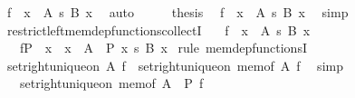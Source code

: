 \begin{isabellebody}
\ {\isacartoucheopen}f\ {\isasymin}\ {\isacharparenleft}{\kern0pt}x\ {\isasymin}\ A{\isacharparenright}{\kern0pt}\ {\isasymrightarrow}s\ {\isacharparenleft}{\kern0pt}B\ x{\isacharparenright}{\kern0pt}{\isacartoucheclose}\ \isamarkupfalse%
\ auto\isanewline
\ \ \isamarkupfalse%
\ \isamarkupfalse%
\ {\isacharquery}{\kern0pt}thesis\ \isamarkupfalse%
\ {\isacartoucheopen}f\ {\isasymin}\ {\isacharparenleft}{\kern0pt}x\ {\isasymin}\ A{\isacharparenright}{\kern0pt}\ {\isasymrightarrow}s\ {\isacharparenleft}{\kern0pt}B\ x{\isacharparenright}{\kern0pt}{\isacartoucheclose}\ \isamarkupfalse%
\ simp\isanewline
{}\isamarkupfalse%
%
\endisatagproof
{\isafoldproof}%
%
\isadelimproof
\isanewline
%
\endisadelimproof
\isanewline
{}\isamarkupfalse%
\ restrict{\isacharunderscore}{\kern0pt}left{\isacharunderscore}{\kern0pt}mem{\isacharunderscore}{\kern0pt}dep{\isacharunderscore}{\kern0pt}functions{\isacharunderscore}{\kern0pt}collectI{\isacharcolon}{\kern0pt}\isanewline
\ \ \ {\isachardoublequoteopen}f\ {\isasymin}\ {\isacharparenleft}{\kern0pt}x\ {\isasymin}\ A{\isacharparenright}{\kern0pt}\ {\isasymrightarrow}s\ {\isacharparenleft}{\kern0pt}B\ x{\isacharparenright}{\kern0pt}{\isachardoublequoteclose}\isanewline
\ \ \ {\isachardoublequoteopen}f{\isasymrestriction}\isactrlbsub P\isactrlesub \ {\isasymin}\ {\isacharparenleft}{\kern0pt}x\ {\isasymin}\ {\isacharbraceleft}{\kern0pt}x\ {\isasymin}\ A\ {\isacharbar}{\kern0pt}\ P\ x{\isacharbraceright}{\kern0pt}{\isacharparenright}{\kern0pt}\ {\isasymrightarrow}s\ {\isacharparenleft}{\kern0pt}B\ x{\isacharparenright}{\kern0pt}{\isachardoublequoteclose}\isanewline
%
\isadelimproof
%
\endisadelimproof
%
\isatagproof
{}\isamarkupfalse%
\ {\isacharparenleft}{\kern0pt}rule\ mem{\isacharunderscore}{\kern0pt}dep{\isacharunderscore}{\kern0pt}functionsI{\isacharparenright}{\kern0pt}\isanewline
\ \ \isamarkupfalse%
\ {\isachardoublequoteopen}set{\isacharunderscore}{\kern0pt}right{\isacharunderscore}{\kern0pt}unique{\isacharunderscore}{\kern0pt}on\ A\ f\ {\isacharequal}{\kern0pt}\ set{\isacharunderscore}{\kern0pt}right{\isacharunderscore}{\kern0pt}unique{\isacharunderscore}{\kern0pt}on\ {\isacharparenleft}{\kern0pt}mem{\isacharunderscore}{\kern0pt}of\ A{\isacharparenright}{\kern0pt}\ f{\isachardoublequoteclose}\ \isamarkupfalse%
\ simp\isanewline
\ \ \isamarkupfalse%
\ \isamarkupfalse%
\ {\isachardoublequoteopen}{\isachardot}{\kern0pt}{\isachardot}{\kern0pt}{\isachardot}{\kern0pt}\ {\isasymle}\ set{\isacharunderscore}{\kern0pt}right{\isacharunderscore}{\kern0pt}unique{\isacharunderscore}{\kern0pt}on\ {\isacharparenleft}{\kern0pt}mem{\isacharunderscore}{\kern0pt}of\ A\ {\isasymsqinter}\ P{\isacharparenright}{\kern0pt}\ f{\isachardoublequoteclose}\isanewline

\end{isabellebody}
